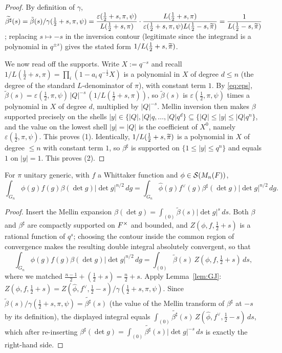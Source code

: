 \begin{proof}
By definition of $\gamma$,
$\widetilde{\beta^\sharp}(s)=\tilde\beta(s)/\gamma(\tfrac12+s,\pi,\psi)
=\dfrac{\varepsilon(\tfrac12+s,\pi,\psi)}{L(\tfrac12+s,\pi)}\cdot
\dfrac{L(\tfrac12+s,\pi)}{\varepsilon(\tfrac12+s,\pi,\psi)L(\tfrac12-s,\widetilde{\pi})}
=\dfrac{1}{L(\tfrac12-s,\widetilde{\pi})}$;
replacing $s\mapsto-s$ in the inversion contour (legitimate since the integrand is a
polynomial in $q^{\pm s}$) gives the stated form $1/L(\tfrac12+s,\widetilde{\pi})$.

We now read off the supports. Write $X:=q^{-s}$ and recall
$1/L(\tfrac12+s,\pi)=\prod_{i}(1-a_i\,q^{-\frac12}X)$ is a polynomial in $X$ of degree
$d\le n$ (the degree of the standard $L$-denominator of $\pi$), with constant term $1$.
By \eqref{eq:eps}, $\tilde\beta(s)=\varepsilon(\tfrac12,\pi,\psi)\,|Q|^{-s}\,(1/L(\tfrac12+s,\pi))$,
so $\tilde\beta(s)$ is $\varepsilon(\tfrac12,\pi,\psi)$ times a polynomial in $X$ of degree
$d$, multiplied by $|Q|^{-s}$. Mellin inversion then makes $\beta$ supported precisely on
the shells $|y|\in\{|Q|,|Q|q,\dots,|Q|q^{d}\}\subseteq\{|Q|\le|y|\le|Q|q^{n}\}$, and the
value on the lowest shell $|y|=|Q|$ is the coefficient of $X^{0}$, namely
$\varepsilon(\tfrac12,\pi,\psi)$. This proves (1). Identically, $1/L(\tfrac12+s,\widetilde{\pi})$
is a polynomial in $X$ of degree $\le n$ with constant term $1$, so $\beta^\sharp$ is
supported on $\{1\le|y|\le q^{n}\}$ and equals $1$ on $|y|=1$. This proves (2).
\end{proof}

\begin{qtwolemma}\label{lem:transfer}
For $\pi$ unitary generic, with $f$ a Whittaker function and
$\phi\in\mathcal{S}(M_n(F))$,
\[
\int_{G_n}\phi(g)f(g)\beta(\det g)|\det g|^{n/2}\,dg
=\int_{G_n}\widehat\phi(g)f^\vee(g)\beta^\sharp(\det g)|\det g|^{n/2}\,dg.
\]
\end{qtwolemma}

\begin{proof}
Insert the Mellin expansion $\beta(\det g)=\int_{(0)}\tilde\beta(s)|\det g|^{s}\,ds$.
Both $\beta$ and $\beta^\sharp$ are compactly supported on $F^\times$ and bounded, and
$Z(\phi,f,\tfrac12+s)$ is a rational function of $q^{s}$; choosing the contour inside the
common region of convergence makes the resulting double integral absolutely convergent, so
that
\[
\int_{G_n}\phi(g)f(g)\beta(\det g)|\det g|^{n/2}\,dg
=\int_{(0)}\tilde\beta(s)\,Z(\phi,f,\tfrac12+s)\,ds ,
\]
where we matched $\tfrac{n-1}{2}+(\tfrac12+s)=\tfrac n2+s$. Apply Lemma~\ref{lem:GJ}:
$Z(\phi,f,\tfrac12+s)=Z(\widehat\phi,f^\vee,\tfrac12-s)/\gamma(\tfrac12+s,\pi,\psi)$.
Since $\tilde\beta(s)/\gamma(\tfrac12+s,\pi,\psi)=\widetilde{\beta^\sharp}(s)$ (the value of
the Mellin transform of $\beta^\sharp$ at $-s$ by its definition), the displayed integral
equals $\int_{(0)}\widetilde{\beta^\sharp}(s)\,Z(\widehat\phi,f^\vee,\tfrac12-s)\,ds$,
which after re-inserting $\beta^\sharp(\det g)=\int_{(0)}\widetilde{\beta^\sharp}(s)|\det g|^{-s}\,ds$
is exactly the right-hand side.
\end{proof}

